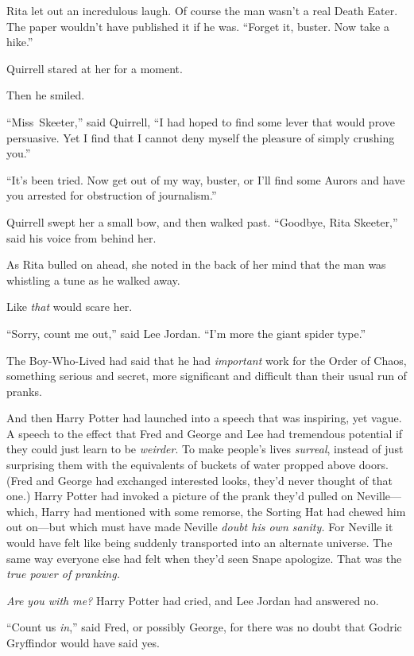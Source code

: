 Rita let out an incredulous laugh. Of course the man wasn’t a real Death Eater. The paper wouldn’t have published it if he was. “Forget it, buster. Now take a hike.”

Quirrell stared at her for a moment.

Then he smiled.

“Miss~Skeeter,” said Quirrell, “I had hoped to find some lever that would prove persuasive. Yet I find that I cannot deny myself the pleasure of simply crushing you.”

“It’s been tried. Now get out of my way, buster, or I’ll find some Aurors and have you arrested for obstruction of journalism.”

Quirrell swept her a small bow, and then walked past. “Goodbye, Rita Skeeter,” said his voice from behind her.

As Rita bulled on ahead, she noted in the back of her mind that the man was whistling a tune as he walked away.

Like \emph{that} would scare her.


“Sorry, count me out,” said Lee Jordan. “I’m more the giant spider type.”

The Boy-Who-Lived had said that he had \emph{important} work for the Order of Chaos, something serious and secret, more significant and difficult than their usual run of pranks.

And then Harry Potter had launched into a speech that was inspiring, yet vague. A speech to the effect that Fred and George and Lee had tremendous potential if they could just learn to be \emph{weirder}. To make people’s lives \emph{surreal}, instead of just surprising them with the equivalents of buckets of water propped above doors. (Fred and George had exchanged interested looks, they’d never thought of that one.) Harry Potter had invoked a picture of the prank they’d pulled on Neville—which, Harry had mentioned with some remorse, the Sorting Hat had chewed him out on—but which must have made Neville \emph{doubt his own sanity.} For Neville it would have felt like being suddenly transported into an alternate universe. The same way everyone else had felt when they’d seen Snape apologize. That was the \emph{true power of pranking.}

\emph{Are you with me?} Harry Potter had cried, and Lee Jordan had answered no.

“Count us \emph{in},” said Fred, or possibly George, for there was no doubt that Godric Gryffindor would have said yes.

